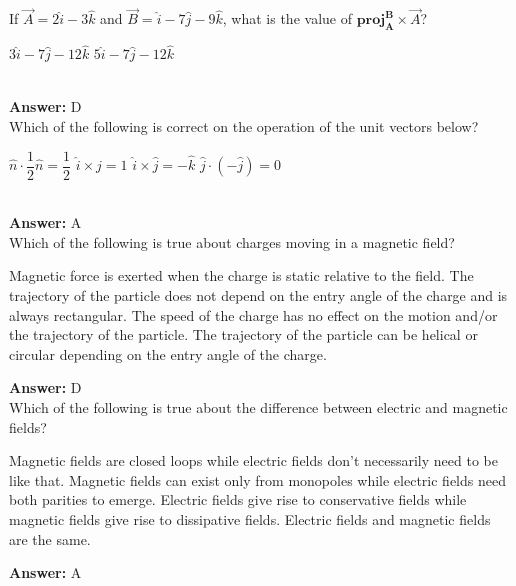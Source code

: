 \documentclass[12pt,addpoints]{exam}
\begin{document}
{{{\begin{questions}
					\question If $\vec{A}=2\hat{i}-3\hat{k}$ and $\vec{B}=\hat{i}-7\hat{j}-9\hat{k}$, what is the value of $\textbf{proj}^{\textbf{B}}_{\textbf{A}}\times\vec{A}$? \\
					\begin{oneparchoices}
						\choice $3\hat{i}-7\hat{j}-12\hat{k}$
						\choice $5\hat{i}-7\hat{j}-12\hat{k}$
					\end{oneparchoices}
					\\ \textbf{Answer:} D\\ 
					\question Which of the following is correct on the operation of the unit vectors below? \\
					\begin{oneparchoices}
						\choice $\hat{n}\cdot\dfrac{1}{2}\hat{n}=\dfrac{1}{2}$
						\choice $\hat{i}\times\hat{j}=1$
						\choice $\hat{i}\times\hat{j}=-\hat{k}$
						\choice $\hat{j}\cdot(-\hat{j})=0$
					\end{oneparchoices}
					\\ \textbf{Answer:} A\\ 
					\question Which of the following is true about charges moving in a magnetic field?
					\begin{choices}
						\choice Magnetic force is exerted when the charge is static relative to the field.
						\choice The trajectory of the particle does not depend on the entry angle of the charge and is always rectangular.
						\choice The speed of the charge has no effect on the motion and/or the trajectory of the particle.
						\choice The trajectory of the particle can be helical or circular depending on the entry angle of the charge.
					\end{choices}
					\textbf{Answer:} D\\ 
					\question Which of the following is true about the difference between electric and magnetic fields?
					\begin{choices}
						\choice Magnetic fields are closed loops while electric fields don't necessarily need to be like that.
						\choice Magnetic fields can exist only from monopoles while electric fields need both parities to emerge.
						\choice Electric fields give rise to conservative fields while magnetic fields give rise to dissipative fields.
						\choice Electric fields and magnetic fields are the same.
					\end{choices}
					\textbf{Answer:} A\\ 

\end{questions}}}}
\end{document}
